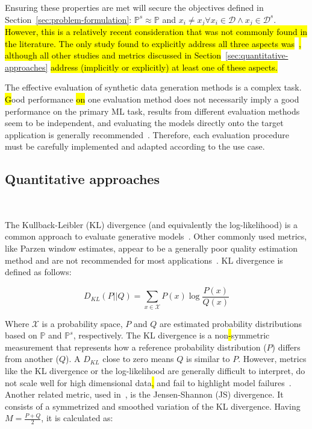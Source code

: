 Ensuring these properties are met will secure the objectives defined in
Section~\ref{sec:problem-formulation}: $\mathbb{P}^s \approx
\mathbb{P}$ and $x_i \neq x_j \forall x_i \in \mathcal{D} \wedge x_j \in
\mathcal{D}^s$. \hl{However, this is a relatively recent consideration that was
not commonly found in the literature. The only study found to explicitly
address all three aspects was}~\cite{alaa2022faithful}\hl{, although all other
studies and metrics discussed in Section}~\ref{sec:quantitative-approaches}
\hl{address (implicitly or explicitly) at least one of these aspects.}

The effective evaluation of synthetic data generation methods is a complex
task. \hl{G}ood performance \hl{on} one evaluation method does not
necessarily imply a good performance on the primary ML task, results from
different evaluation methods seem to be independent, and evaluating the models
directly onto the target application is generally
recommended~\cite{theis2016note}. Therefore, each evaluation procedure must be
carefully implemented and adapted according to the use case.

\subsection{Quantitative approaches}~\label{sec:quantitative-approaches}

The Kullback-Leibler (KL) divergence (and equivalently the log-likelihood) is a
common approach to evaluate generative models~\cite{theis2016note}. Other
commonly used metrics, like Parzen window estimates, appear to be a generally
poor quality estimation method and are not recommended for most
applications~\cite{theis2016note}. KL divergence is defined as follows:

\begin{equation}
    D_{KL}(P||Q) = \sum_{x\in\mathcal{X}}P(x)\log{\frac{P(x)}{Q(x)}}
\end{equation}

Where $\mathcal{X}$ is a probability space, $P$ and $Q$ are estimated
probability distributions based on $\mathbb{P}$ and $\mathbb{P}^s$,
respectively. The KL divergence is a non\hl{-}symmetric measurement that represents
how a reference probability distribution ($P$) differs from another
($Q$). A $D_{KL}$ close to zero means $Q$ is similar to $P$. However, metrics
like the KL divergence or the log-likelihood are generally difficult to
interpret, do not scale well for high dimensional data\hl{,} and fail to
highlight model failures~\cite{alaa2022faithful}. Another related metric, used
in~\cite{zhao2021ctab}, is the Jensen-Shannon (JS) divergence. It consists of
a symmetrized and smoothed variation of the KL divergence. Having
$M=\frac{P+Q}{2}$, it is calculated as:


